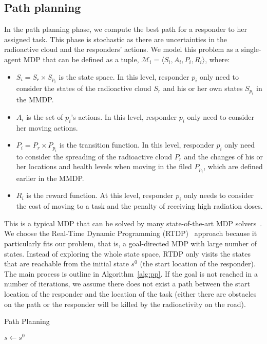 \subsection{Path planning}
\label{sec:pathplanning}
\noindent In the path planning phase, we compute the best path for a
responder to her assigned task. This phase
is stochastic as there are uncertainties in the radioactive cloud
and the responders' actions. We model this problem as a
single-agent MDP that can be defined as a tuple, $\mathcal{M}_i =
\langle S_i, A_i, P_i, R_i \rangle$, where:
\begin{itemize}
  \item $S_i = S_r \times S_{p_i}$ is the state space. In this
      level, responder $p_i$ only need to consider the states
      of the radioactive cloud $S_r$ and his or her own states
      $S_{p_i}$ in the MMDP.
  \item $A_i$ is the set of $p_i$'s actions. In this level,
      responder $p_i$ only need to consider her moving
      actions.
  \item $P_i = P_r \times P_{p_i}$ is the transition function.
      In this level, responder $p_i$ only need to consider the
      spreading of the radioactive cloud $P_r$ and the changes
      of his or her locations and health levels when moving in
      the filed $P_{p_i}$, which are defined earlier in the
      MMDP.
  \item $R_i$ is the reward function. At this level, responder
      $p_i$ only needs to consider the cost of moving to a task and the
      penalty of receiving high radiation doses.
\end{itemize}
This is a typical MDP that can be solved by many state-of-the-art
MDP solvers~\cite{?}. We choose the Real-Time Dynamic
Programming (RTDP)~\cite{?} approach because it particularly fits  our
problem, that is, a goal-directed MDP with large number of states. Instead
of exploring the whole state space, RTDP only visits the states
that are reachable from the initial state $s^0$ (the start location
of the responder). The main process is outline in
Algorithm~\ref{alg:pp}. If the goal is not reached in a number of
iterations, we assume there does not exist a path between the start location
of the responder and the location of the task  (either there are obstacles
on the path or the responder will be killed by the radioactivity on
the road).
\begin{algorithm}[htbp]
  \caption{Path Planning}
  $s \gets s^0$ \;
  \label{alg:pp}
\end{algorithm}
